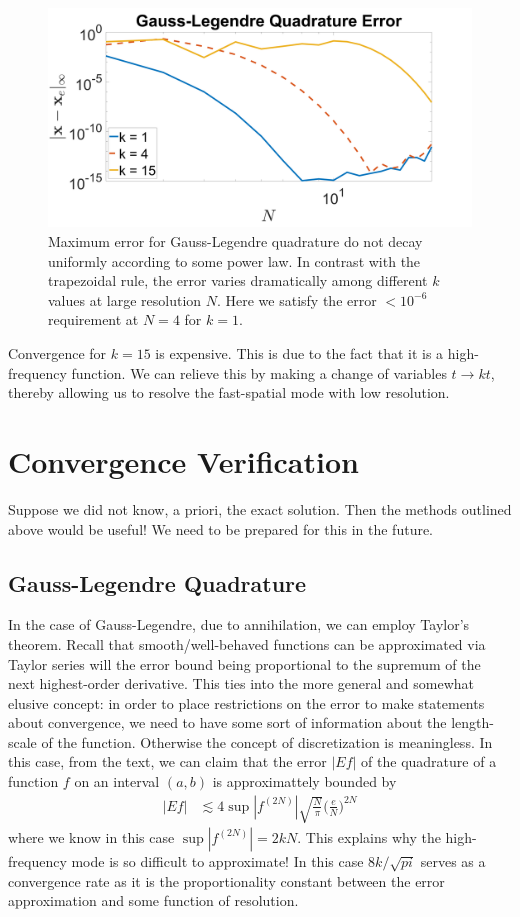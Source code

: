 \documentclass[10pt]{article}
\begin{document}
\begin{figure}[H]
    \centering
    \includegraphics[width=5in]{gl_error.png}
    \caption{Maximum error for Gauss-Legendre quadrature do not decay uniformly according to some power law. In contrast with the trapezoidal rule, the error varies dramatically among different $k$ values at large resolution $N$. Here we satisfy the error $<10^{-6}$ requirement at $N = 4$ for $k = 1$.}
    \label{gl_error}
\end{figure}

Convergence for $k = 15$ is expensive. This is due to the fact that it is a high-frequency function. We can relieve this by making a change of variables $t \to kt$, thereby allowing us to resolve the fast-spatial mode with low resolution.

\section*{Convergence Verification}
Suppose we did not know, a priori, the exact solution. Then the methods outlined above would be useful! We need to be prepared for this in the future.

\subsection*{Gauss-Legendre Quadrature}
 In the case of Gauss-Legendre, due to annihilation, we can employ Taylor's theorem. Recall that smooth/well-behaved functions can be approximated via Taylor series will the error bound being proportional to the supremum of the next highest-order derivative. This ties into the more general and somewhat elusive concept: in order to place restrictions on the error to make statements about convergence, we need to have some sort of information about the length-scale of the function. Otherwise the concept of discretization is meaningless. In this case, from the text, we can claim that the error $|Ef|$ of the quadrature of a function $f$ on an interval $(a, b)$ is approximattely bounded by 
\begin{align*}
    |Ef| &\lesssim 4 \sup |f^{(2N)}| \sqrt{\frac{N}{\pi}} \Big( \frac{e}{N} \Big)^{2N}
\end{align*}
where we know in this case $\sup |f^{(2N)}| = 2kN$. This explains why the high-frequency mode is so difficult to approximate! In this case $8k/\sqrt{pi}$ serves as a convergence rate as it is the proportionality constant between the error approximation and some function of resolution.
\end{document}
